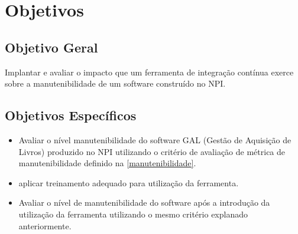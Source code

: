 \chapter{Objetivos}\label{objetivos}
\section{Objetivo Geral}\label{objetivoger}
Implantar e avaliar o impacto que um ferramenta de integração contínua exerce sobre a manutenibilidade de um software construído no NPI.

\section{Objetivos Específicos}

\begin{itemize}
\item Avaliar o nível manutenibilidade do software GAL (Gestão de Aquisição de Livros) produzido no NPI utilizando o critério de avaliação de métrica de manutenibilidade definido na \autoref{manutenibilidade}.
\item aplicar treinamento adequado para utilização da ferramenta.
\item Avaliar o nível de manutenibilidade do software após a introdução da utilização da ferramenta utilizando o mesmo critério explanado anteriormente.
\end{itemize}